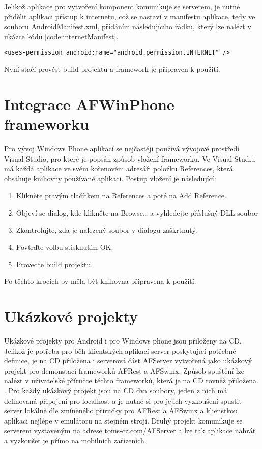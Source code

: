 Jelikož aplikace pro vytvoření komponent komunikuje se serverem, je nutné přidělit aplikaci přístup k internetu, což se nastaví v manifestu aplikace, tedy ve souboru AndroidManifest.xml, přidáním následujícího řádku, který lze nalézt v ukázce kódu \ref{code:internetManifest}.
\begin{lstlisting}[caption={Android manifest - udělení přístupu k internetu},
label={code:internetManifest}, basicstyle=\footnotesize, frame=single]
<uses-permission android:name="android.permission.INTERNET" /> 
\end{lstlisting}

Nyní stačí provést build projektu a framework je připraven k použití.

\section{Integrace AFWinPhone frameworku}
Pro vývoj Windows Phone aplikací se nejčastěji používá vývojové prostředí Visual Studio, pro které je popsán způsob vložení frameworku. Ve Visual Studiu má každá aplikace ve svém kořenovém adresáři položku References, která obsahuje knihovny používané aplikací. Postup vložení je následující:
\begin{enumerate}
\item Klikněte pravým tlačítkem na References a poté na Add Reference.
\item Objeví se dialog, kde klikněte na Browse… a vyhledejte příslušný DLL soubor
\item Zkontrolujte, zda je nalezený soubor v dialogu zaškrtnutý.
\item Povtrďte volbu stisknutím OK.
\item Proveďte build projektu. 
\end{enumerate}
Po těchto krocích by měla být knihovna připravena k použití.

\section{Ukázkové projekty}
Ukázkové projekty pro Android i pro Windows phone jsou přiloženy na CD. Jelikož je potřeba pro běh klientských aplikací server poskytující potřebné definice, je na CD přiložena i serverová část AFServer vytvořená jako ukázkový projekt pro demonstaci frameworků AFRest a AFSwinx. Způsob spuštění lze nalézt v uživatelské příručce těchto frameworků, která je na CD rovněž přiložena. \cite{tomasek-thesis}. Pro každý ukázkový projekt jsou na CD dva soubory, jeden z nich má definovaná připojení pro localhost a je nutné si pro jejich vyzkoušení spustit server lokálně dle zmíněného příručky pro AFRest a AFSwinx a klienstkou aplikaci nejlépe v emulátoru na stejném stroji. Druhý projekt komunikuje se serverem vystaveným na adrese \url{toms-cz.com/AFServer} a lze tak aplikace nahrát a vyzkoušet je přímo na mobilních zařízeních. 
